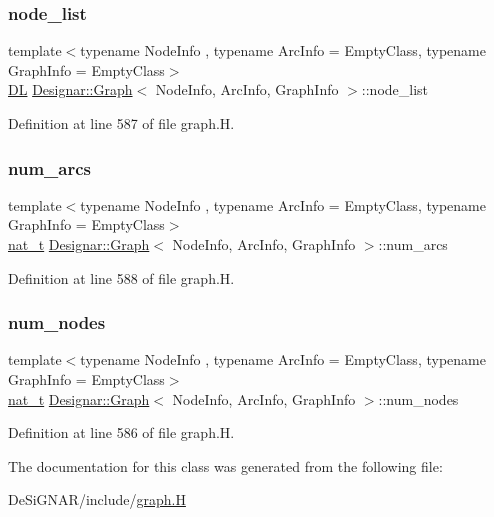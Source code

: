 \subsubsection{\texorpdfstring{node\+\_\+list}{node\_list}}
{\footnotesize\ttfamily template$<$typename Node\+Info , typename Arc\+Info  = Empty\+Class, typename Graph\+Info  = Empty\+Class$>$ \\
\hyperlink{class_designar_1_1_d_l}{DL} \hyperlink{class_designar_1_1_graph}{Designar\+::\+Graph}$<$ Node\+Info, Arc\+Info, Graph\+Info $>$\+::node\+\_\+list\hspace{0.3cm}{\ttfamily [protected]}}



Definition at line 587 of file graph.\+H.

\mbox{\label{class_designar_1_1_graph_a035a0debf7a7545d0033f37cf941020f}} 
\subsubsection{\texorpdfstring{num\+\_\+arcs}{num\_arcs}}
{\footnotesize\ttfamily template$<$typename Node\+Info , typename Arc\+Info  = Empty\+Class, typename Graph\+Info  = Empty\+Class$>$ \\
\hyperlink{namespace_designar_aa72662848b9f4815e7bf31a7cf3e33d1}{nat\+\_\+t} \hyperlink{class_designar_1_1_graph}{Designar\+::\+Graph}$<$ Node\+Info, Arc\+Info, Graph\+Info $>$\+::num\+\_\+arcs\hspace{0.3cm}{\ttfamily [protected]}}



Definition at line 588 of file graph.\+H.

\mbox{\label{class_designar_1_1_graph_a1ff2ba87ab27911b1f6d47e622e67542}} 
\subsubsection{\texorpdfstring{num\+\_\+nodes}{num\_nodes}}
{\footnotesize\ttfamily template$<$typename Node\+Info , typename Arc\+Info  = Empty\+Class, typename Graph\+Info  = Empty\+Class$>$ \\
\hyperlink{namespace_designar_aa72662848b9f4815e7bf31a7cf3e33d1}{nat\+\_\+t} \hyperlink{class_designar_1_1_graph}{Designar\+::\+Graph}$<$ Node\+Info, Arc\+Info, Graph\+Info $>$\+::num\+\_\+nodes\hspace{0.3cm}{\ttfamily [protected]}}



Definition at line 586 of file graph.\+H.



The documentation for this class was generated from the following file\+:\begin{DoxyCompactItemize}
\item 
De\+Si\+G\+N\+A\+R/include/\hyperlink{graph_8_h}{graph.\+H}\end{DoxyCompactItemize}
